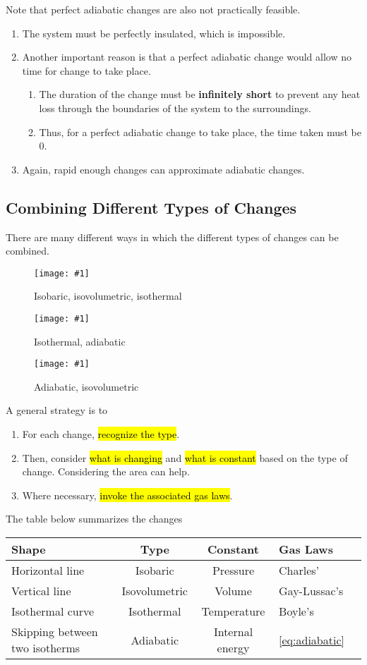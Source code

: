 \documentclass[a4paper,12pt]{article}
\newcommand{\img}[4]{\begin{center}
  \begin{figure}[H]
    \centering
    \texttt{[image: \#1]}
    \caption{#3}
    \label{fig:#4}
  \end{figure}
\end{center}}
\newcommand{\tripleimg}[9]{
  \begin{minipage}{0.3\textwidth}
    \img{#1}{1}{#2}{#3}
  \end{minipage}%
  \hspace*{0.05\textwidth}%
  \begin{minipage}{0.3\textwidth}
    \img{#4}{1}{#5}{#6}
  \end{minipage}%
  \hspace*{0.05\textwidth}%
  \begin{minipage}{0.3\textwidth}
    \img{#7}{1}{#8}{#9}
  \end{minipage}%
}
\begin{document}
Note that perfect adiabatic changes are also not practically feasible.
\begin{enumerate}
  \item The system must be perfectly insulated, which is impossible.
  \item Another important reason is that a perfect adiabatic change would allow no time for change to take place.
        \begin{enumerate}
          \item The duration of the change must be \textbf{infinitely short} to prevent any heat loss through the boundaries of the system to the surroundings.
          \item Thus, for a perfect adiabatic change to take place, the time taken must be 0.
        \end{enumerate}
  \item Again, rapid enough changes can approximate adiabatic changes.
\end{enumerate}

\subsection{Combining Different Types of Changes}

There are many different ways in which the different types of changes can be combined.

\tripleimg%
{combined0.png}{Isobaric, isovolumetric, isothermal}{combined0}%
{combined1.png}{Isothermal, adiabatic}{combined1}%
{combined2.png}{Adiabatic, isovolumetric}{combined2}

A general strategy is to
\begin{enumerate}
  \item For each change, \hl{recognize the type}.
  \item Then, consider \hl{what is changing} and \hl{what is constant} based on the type of change. Considering the area can help.
  \item Where necessary, \hl{invoke the associated gas laws}.
\end{enumerate}

The table below summarizes the changes

\begin{table}[H]
  \centering
  \begin{tabular}{|P{0.2\textwidth}|c|c|P{0.23\textwidth}|c|}
    \hline
     \textbf{Shape} & \textbf{Type} & \textbf{Constant} & \textbf{Gas Laws}   \\ \hline
    Horizontal line                            & Isobaric      & Pressure          & Charles'            \\ \hline
    Vertical line                              & Isovolumetric & Volume            & Gay-Lussac's        \\ \hline
    Isothermal curve                           & Isothermal    & Temperature       & Boyle's             \\ \hline
    Skipping between two isotherms             & Adiabatic     & Internal energy   & \cref{eq:adiabatic} \\ \hline
  \end{tabular}
\end{table}
\end{document}
